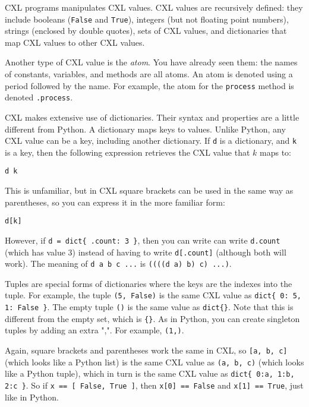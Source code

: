 \documentclass{report}
\newenvironment{code}{
\tcolorbox
}{
\endtcolorbox
}
\begin{document}
CXL programs manipulates CXL values.
CXL values are recursively defined:
they include booleans (\texttt{False} and \texttt{True}),
integers (but not floating point numbers),
strings (enclosed by double quotes),
sets of CXL values,
and dictionaries that map CXL values to other CXL values.

Another type of CXL value is the \emph{atom}.  You have already
seen them: the names of constants, variables, and methods are
all atoms.  An atom is denoted using a period followed by the
name.  For example, the atom for the \texttt{process} method
is denoted \texttt{.process}.

CXL makes extensive use of dictionaries.  Their syntax and properties
are a little different from Python.
A dictionary maps keys to values.
Unlike Python, any CXL value can be a key, including another
dictionary.
If \texttt{d} is a dictionary, and \texttt{k} is a key, then the
following expression retrieves the CXL value that $k$ maps to:
\begin{code}
\begin{verbatim}
d k
\end{verbatim}
\end{code}
This is unfamiliar, but in CXL square brackets can be used in the
same way as parentheses, so you can express it in the more familiar
form:
\begin{code}
\begin{verbatim}
d[k]
\end{verbatim}
\end{code}
However, if \texttt{d = dict\{ .count: 3 \}}, then you can write
can write \texttt{d.count} (which has value 3) instead of having to write
\texttt{d[.count]} (although both will work).
The meaning of \texttt{d a b c ...} is \texttt{((((d a) b) c) ...)}.

Tuples are special forms of dictionaries where the keys are
the indexes into the tuple.  For example, the tuple
\texttt{(5, False)} is the same CXL value as
\texttt{dict\{ 0: 5, 1: False \}}.
The empty tuple \texttt{()} is the same value as \texttt{dict\{\}}.
Note that this is different from the empty set, which is \texttt{\{\}}.
As in Python, you can create singleton tuples by adding an
extra ",". For example, \texttt{(1,)}.

Again, square brackets and parentheses work the same in CXL, so
\texttt{[a, b, c]} (which looks like a Python list)
is the same CXL value as \texttt{(a, b, c)} (which looks like a Python tuple),
which in turn is the same CXL value as \texttt{dict\{ 0:a, 1:b, 2:c \}}.
So if \texttt{x == [ False, True ]},
then \texttt{x[0] == False} and \texttt{x[1] == True}, just like in Python.
\end{document}
